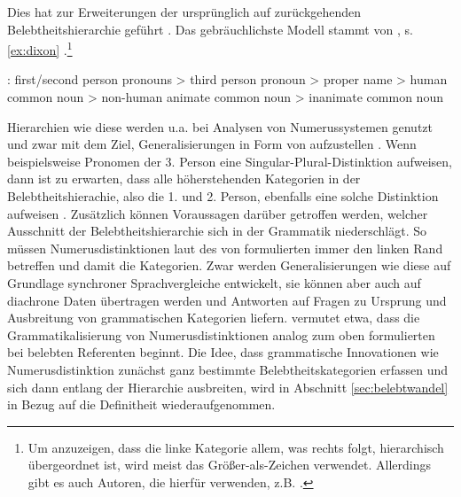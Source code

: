 Dies hat zur Erweiterungen der ursprünglich auf \textcite{Silverstein1976} zurückgehenden Belebtheitshierarchie geführt \parencite[vgl. u.a.][]{Allan1987,Langacker1991,Langacker2008,Dixon1995,Corbett2000,Foley2007}. Das gebräuchlichste Modell stammt von \textcite[85]{Dixon1995}, s. \ref{ex:dixon} \parencite[vgl.][130]{Croft2006}.\footnote{Um anzuzeigen, dass die linke Kategorie allem, was rechts folgt, hierarchisch übergeordnet ist, wird meist das Größer-als-Zeichen \hervor{>} verwendet. Allerdings gibt es auch Autoren, die hierfür \hervor{<} verwenden, z.B. \textcite{Allan1987,Croft2006}.}  

\begin{exe}
	\ex \label{ex:dixon} : first/second person pronouns > third person pronoun > proper name > human common noun > non-human animate common noun > inanimate common noun
	\end{exe}
\noindent
Hierarchien wie diese werden u.a. bei Analysen von Numerussystemen genutzt \parencite{Corbett2000,Croft2006} und zwar mit dem Ziel, Generalisierungen in Form von  \parencite[2]{Zifonun2006} aufzustellen \parencite[vgl. auch][47]{Dahl1996}. Wenn beispielsweise Pronomen der 3. Person eine Singular-Plural-Distinktion aufweisen, dann ist zu erwarten, dass alle höherstehenden Kategorien in der Belebtheitshierachie, also die 1. und 2. Person, ebenfalls eine solche Distinktion aufweisen \parencite[129]{Croft2006}. Zusätzlich können Voraussagen darüber getroffen werden, welcher Ausschnitt der Belebtheitshierarchie sich in der Grammatik niederschlägt. So müssen Numerusdistinktionen laut des von \textcite[56]{Corbett2000} formulierten  immer den linken Rand betreffen und damit die  Kategorien. Zwar werden Generalisierungen wie diese auf Grundlage synchroner Sprachvergleiche entwickelt, sie können aber auch auf diachrone Daten übertragen werden und Antworten auf Fragen zu Ursprung und Ausbreitung von grammatischen Kategorien liefern. \textcite[265ff.]{Corbett2000} vermutet etwa, dass die Grammatikalisierung von Numerusdistinktionen analog zum oben formulierten  bei belebten Referenten beginnt. Die Idee, dass grammatische Innovationen wie Numerusdistinktion zunächst ganz bestimmte Belebtheitskategorien erfassen und sich dann entlang der Hierarchie ausbreiten, wird in Abschnitt \ref{sec:belebtwandel} in Bezug auf die Definitheit wiederaufgenommen. 

